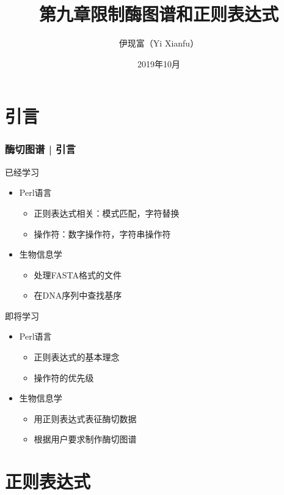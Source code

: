 


\title[限制酶图谱和正则表达式]{第九章\quad 限制酶图谱和正则表达式}
\author[Yixf]{伊现富（Yi Xianfu）}
\date{2019年10月}



\section{引言}
\begin{frame}
  \frametitle{酶切图谱 | 引言}
  \begin{block}{已经学习}
    \begin{itemize}
      \item Perl语言
	\begin{itemize}
	  \item 正则表达式相关：模式匹配，字符替换
	  \item 操作符：数字操作符，字符串操作符
	\end{itemize}
      \item 生物信息学
	\begin{itemize}
	  \item 处理FASTA格式的文件
	  \item 在DNA序列中查找基序
	\end{itemize}
    \end{itemize}
  \end{block}
  \pause
  \begin{block}{即将学习}
    \begin{itemize}
      \item Perl语言
	\begin{itemize}
	  \item 正则表达式的基本理念
	  \item 操作符的优先级
	\end{itemize}
      \item 生物信息学
	\begin{itemize}
	  \item 用正则表达式表征酶切数据
	  \item 根据用户要求制作酶切图谱
	\end{itemize}
    \end{itemize}
  \end{block}
\end{frame}

\section{正则表达式}
